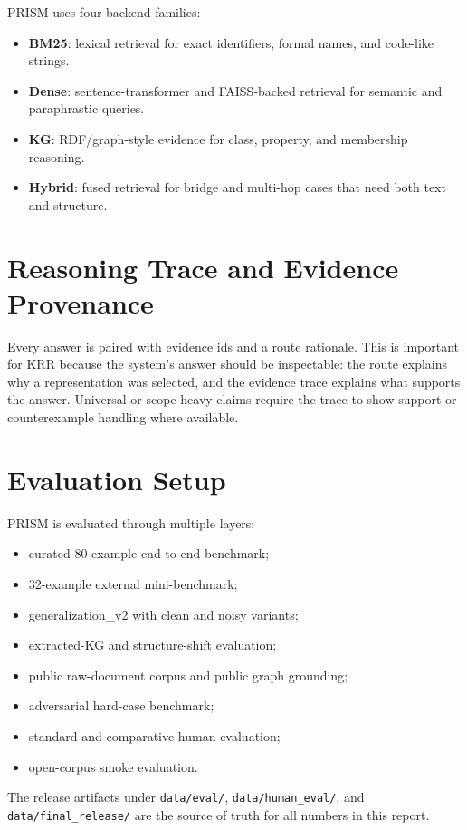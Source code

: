 \documentclass{article}
\begin{document}
PRISM uses four backend families:
\begin{itemize}
    \item \textbf{BM25}: lexical retrieval for exact identifiers, formal names, and code-like strings.
    \item \textbf{Dense}: sentence-transformer and FAISS-backed retrieval for semantic and paraphrastic queries.
    \item \textbf{KG}: RDF/graph-style evidence for class, property, and membership reasoning.
    \item \textbf{Hybrid}: fused retrieval for bridge and multi-hop cases that need both text and structure.
\end{itemize}

\section{Reasoning Trace and Evidence Provenance}

Every answer is paired with evidence ids and a route rationale. This is important for KRR because the system's answer should be inspectable: the route explains why a representation was selected, and the evidence trace explains what supports the answer. Universal or scope-heavy claims require the trace to show support or counterexample handling where available.

\section{Evaluation Setup}

PRISM is evaluated through multiple layers:
\begin{itemize}
    \item curated 80-example end-to-end benchmark;
    \item 32-example external mini-benchmark;
    \item generalization\_v2 with clean and noisy variants;
    \item extracted-KG and structure-shift evaluation;
    \item public raw-document corpus and public graph grounding;
    \item adversarial hard-case benchmark;
    \item standard and comparative human evaluation;
    \item open-corpus smoke evaluation.
\end{itemize}

The release artifacts under \texttt{data/eval/}, \texttt{data/human\_eval/}, and \texttt{data/final\_release/} are the source of truth for all numbers in this report.
\end{document}

